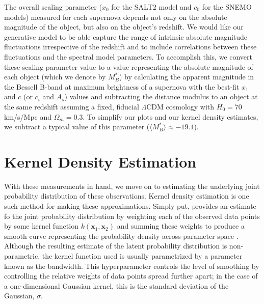 The overall scaling parameter ($x_0$ for the SALT2 model and $c_0$ for the SNEMO models) measured for each supernova depends not only on the absolute magnitude of the object, but also on the object's redshift. We would like our generative model to be able capture the range of intrinsic absolute magnitude fluctuations irrespective of the redshift and to include correlations between these fluctuations and the spectral model parameters. To accomplish this, we convert these scaling parameter value to a value representing the absolute magnitude of each object (which we denote by $M_B^*$) by calculating the apparent magnitude in the Bessell B-band at maximum brightness of a supernova with the best-fit $x_1$ and $c$ (or $c_i$ and $A_s$) values and subtracting the distance modulus to an object at the same redshift assuming a fixed, fiducial $\Lambda$CDM cosmology with $H_0=70$ km/s/Mpc and $\Omega_{m}=0.3$. To simplify our plots and our kernel density estimates, we subtract a typical value of this parameter ($\langle M_B^*\rangle \approx -19.1$).


% 

\section{Kernel Density Estimation}
\label{sec:kde}
With these measurements in hand, we move on to estimating the underlying joint probability distribution of these observations. Kernel density estimation is one such method for making these approximations. Simply put, provides an estimate fo the joint probability distribution by weighting each of the observed data points by some kernel function $k(\bm{x}_{1}, \bm{x}_{2})$ and summing these weights to produce a smooth curve representing the probability density across parameter space \citep{silverman_density_1986, wand_kernel_1995, scott_multivariate_2014}. Although the resulting estimate of the latent probability distribution is non-parametric, the kernel function used is usually parametrized by a parameter known as the bandwidth. This hyperparameter controls the level of smoothing by controlling the relative weights of data points spread further apart; in the case of a one-dimensional Gaussian kernel, this is the standard deviation of the Gaussian, $\sigma$.

